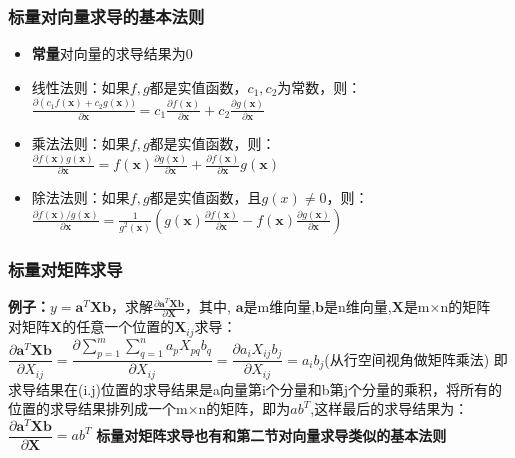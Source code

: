     \subsubsection{标量对向量求导的基本法则}
    \begin{itemize}
        \item \textbf{常量}对向量的求导结果为0
        \item 线性法则：如果$f,g$都是实值函数，$c_1,c_2$为常数，则：$\frac{\partial\left(c_{1} f(\mathbf{x})+c_{2} g(\mathbf{x}))\right.}{\partial \mathbf{x}}=c_{1} \frac{\partial f(\mathbf{x})}{\partial \mathbf{x}}+c_{2} \frac{\partial g(\mathbf{x})}{\partial \mathbf{x}}$
        \item 乘法法则：如果$f,g$都是实值函数，则：$\frac{\partial f(\mathbf{x}) g(\mathbf{x})}{\partial \mathbf{x}}=f(\mathbf{x}) \frac{\partial g(\mathbf{x})}{\partial \mathbf{x}}+\frac{\partial f(\mathbf{x})}{\partial \mathbf{x}} g(\mathbf{x})$
        \item 除法法则：如果$f,g$都是实值函数，且$g(x)≠0$，则：$\frac{\partial f(\mathbf{x}) / g(\mathbf{x})}{\partial \mathbf{x}}=\frac{1}{g^{2}(\mathbf{x})}\left(g(\mathbf{x}) \frac{\partial f(\mathbf{x})}{\partial \mathbf{x}}-f(\mathbf{x}) \frac{\partial g(\mathbf{x})}{\partial \mathbf{x}}\right)$
    \end{itemize}

    \subsubsection{标量对矩阵求导}
    \textbf{例子：}$y=\mathbf{a}^{T} \mathbf{X} \mathbf{b}$，求解$\frac{\partial \mathbf{a}^{T} \mathbf{X} \mathbf{b}}{\partial \mathbf{X}}$，其中, $\bm{a}$是m维向量,$\bm{b}$是n维向量,$\bm{X}$是m×n的矩阵
    \\
    对矩阵$\bm{X}$的任意一个位置的$\bm{X}_{ij}$求导：
    \\
    $\dfrac{\partial \mathbf{a}^{T} \mathbf{X} \mathbf{b}}{\partial X_{i j}}=\dfrac{\partial \sum_{p=1}^{m} \sum_{q=1}^{n} a_{p} X_{p q} b_{q}}{\partial X_{i j}}=\dfrac{\partial a_{i} X_{i j} b_{j}}{\partial X_{i j}}=a_{i} b_{j}$(从行空间视角做矩阵乘法)
    即求导结果在(i.j)位置的求导结果是a向量第i个分量和b第j个分量的乘积，将所有的位置的求导结果排列成一个m×n的矩阵，即为$ab^T$,这样最后的求导结果为：$\dfrac{\partial \mathbf{a}^{T} \mathbf{X} \mathbf{b}}{\partial \mathbf{X}}=a b^{T}$
    \textbf{标量对矩阵求导也有和第二节对向量求导类似的基本法则}

